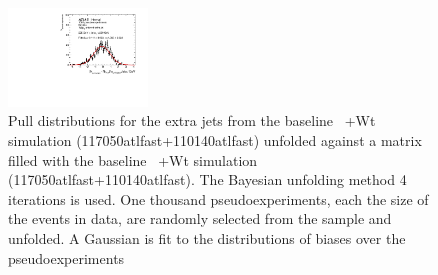 \begin{figure}
\includegraphics[width=0.33\textwidth]{fig/UnfoldPull/SingleSlicePull15.pdf}
\caption{Pull distributions for the extra jets from the baseline \ttbar\ +Wt simulation (117050atlfast+110140atlfast) unfolded against a matrix filled with the baseline \ttbar\ +Wt simulation (117050atlfast+110140atlfast). The Bayesian unfolding method 4 iterations is used. One thousand pseudoexperiments, each the size of the events in data, are randomly selected from the sample and unfolded.  A Gaussian is fit to the distributions of biases over the pseudoexperiments}
\label{fig:appPull0}
\end{figure}
